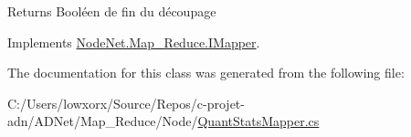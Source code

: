 \begin{DoxyReturn}{Returns}
Booléen de fin du découpage
\end{DoxyReturn}


Implements \hyperlink{interface_node_net_1_1_map___reduce_1_1_i_mapper_a0d6d2bd1a8081efa0d6df109af9c4ec1}{Node\+Net.\+Map\+\_\+\+Reduce.\+I\+Mapper}.



The documentation for this class was generated from the following file\+:\begin{DoxyCompactItemize}
\item 
C\+:/\+Users/lowxorx/\+Source/\+Repos/c-\/projet-\/adn/\+A\+D\+Net/\+Map\+\_\+\+Reduce/\+Node/\hyperlink{_quant_stats_mapper_8cs}{Quant\+Stats\+Mapper.\+cs}\end{DoxyCompactItemize}
